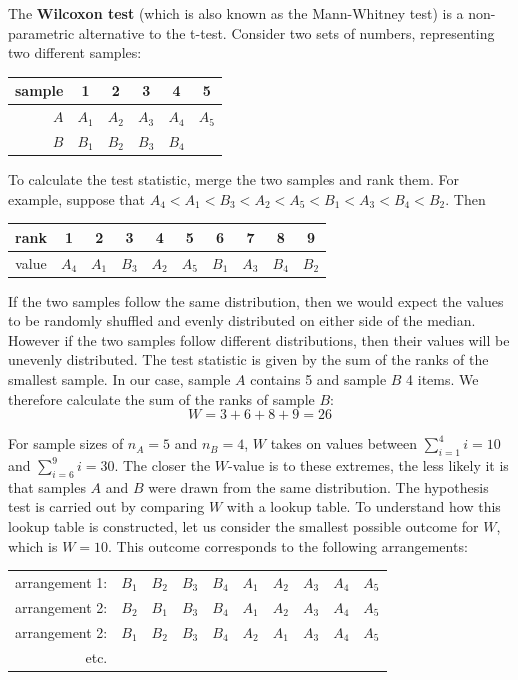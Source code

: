 The \textbf{Wilcoxon test} (which is also known as the Mann-Whitney
test) is a non-parametric alternative to the t-test. Consider two sets
of numbers, representing two different samples:

\begin{center}
\begin{tabular}{r|ccccc}
 sample & 1 & 2 & 3 & 4 & 5 \\ \hline
 $A$ & $A_1$ & $A_2$ & $A_3$ & $A_4$ & $A_5$ \\
 $B$ & $B_1$ & $B_2$ & $B_3$ & $B_4$ 
\end{tabular}
\label{tab:mannwhitneygeneric}
\end{center}

\noindent To calculate the test statistic, merge the two samples and
rank them.  For example, suppose that $A_4 < A_1 < B_3 < A_2  < A_5 <
B_1 < A_3 < B_4 < B_2$. Then

\begin{center}
\begin{tabular}{c|ccccccccc}
  rank & 1 & 2 & 3 & 4 & 5 & 6 & 7 & 8 & 9 \\ \hline
  value & $A_4$ & $A_1$ & $B_3$ & $A_2$ & $A_5$ & $B_1$ & $A_3$ & $B_4$ & $B_2$
\end{tabular}
\end{center}

If the two samples follow the same distribution, then we would expect
the values to be randomly shuffled and evenly distributed on either
side of the median. However if the two samples follow different
distributions, then their values will be unevenly distributed.  The
test statistic is given by the sum of the ranks of the smallest
sample. In our case, sample $A$ contains 5 and sample $B$ 4 items.  We
therefore calculate the sum of the ranks of sample $B$:
\[
W = 3 + 6 + 8 + 9 = 26
\]

For sample sizes of $n_A=5$ and $n_B=4$, $W$ takes on values between
$\sum_{i=1}^{4}i=10$ and $\sum_{i=6}^{9}i=30$. The closer the
$W$-value is to these extremes, the less likely it is that samples $A$
and $B$ were drawn from the same distribution. The hypothesis test is
carried out by comparing $W$ with a lookup table. To understand how
this lookup table is constructed, let us consider the smallest
possible outcome for $W$, which is $W=10$. This outcome corresponds to
the following arrangements:

\begin{center}
  \begin{tabular}{r|ccccccccc}
    arrangement 1: & $B_1$ & $B_2$ & $B_3$ & $B_4$ & $A_1$ &
    $A_2$ & $A_3$ & $A_4$ & $A_5$ \\
    arrangement 2: & $B_2$ & $B_1$ & $B_3$ & $B_4$ & $A_1$ &
    $A_2$ & $A_3$ & $A_4$ & $A_5$ \\
    arrangement 2: & $B_1$ & $B_2$ & $B_3$ & $B_4$ & $A_2$ &
    $A_1$ & $A_3$ & $A_4$ & $A_5$ \\
    etc. & & & & & & & & & 
  \end{tabular}
\end{center}

